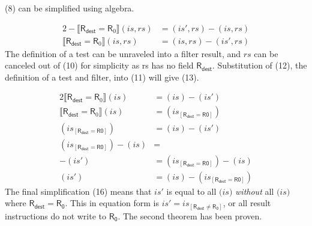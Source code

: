 \documentclass[12pt, letterpaper]{article}
\newcommand\interp[1]{\llbracket #1 \rrbracket}
\begin{document}
     (8) can be simplified using algebra.
 \par\nobreak
 {\fontsize{10pt}{12pt}\selectfont
 \begin{alignat}{2}    
     - \interp{ \mathsf{R}_{\mathsf{dest}} = \mathsf{R}_0 } (\mathit{is}, \mathit{rs}) 
     &=
     (\mathit{is}', \mathit{rs}) - (\mathit{is}, \mathit{rs})
     \\
     \interp{ \mathsf{R}_{\mathsf{dest}} = \mathsf{R}_0 } (\mathit{is}, \mathit{rs}) 
     &=
     (\mathit{is}, \mathit{rs}) - (\mathit{is}', \mathit{rs})
 \end{alignat}
 }%
     The definition of a test can be unraveled into a filter result, and $\mathit{rs}$ can be canceled out of (10) for simplicity as rs has no field $\mathsf{R_{dest}}$.  Substitution of (12), the definition of a test and filter, into (11) will give (13).
 \par\nobreak
 {\fontsize{10pt}{12pt}\selectfont
 \begin{alignat}{2}
     \interp{ \mathsf{R}_{\mathsf{dest}} = \mathsf{R}_0 } (\mathit{is})
     &=
     (\mathit{is}) - (\mathit{is}')
     \\
     \interp{ \mathsf{R}_{\mathsf{dest}} = \mathsf{R}_0 } (\mathit{is})
     &=
     (\mathit{is_{[\mathsf{R_{dest}=R0}]}})
     \\
     (\mathit{is_{[\mathsf{R_{dest}=R0}]}})
     &=
     (\mathit{is}) - (\mathit{is}')
     \\
     (\mathit{is_{[\mathsf{R_{dest}=R0}]}}) - (\mathit{is}) 
     &=
     \\
     - (\mathit{is}')
     &=
     (\mathit{is_{[\mathsf{R_{dest}=R0}]}}) - (\mathit{is})
     \\
     (\mathit{is}')
     &=
     (\mathit{is}) - (\mathit{is_{[\mathsf{R_{dest}=R0}]}})
 \end{alignat}
 }%
     The final simplification (16) means that $\mathit{is}'$ is equal to all $\mathit(is)$ \textit{without} all $\mathit(is)$ where $\mathsf{R_{dest}} = \mathsf{R_{0}}$.
     This in equation form is $\mathit{is}' = \mathit{is_{[\mathsf{R_{dest} \neq \mathsf{R_{0}}}]}}$, or all result instructions do not write to $\mathsf{R_{0}}$.  The second theorem has been proven.
\end{document}
